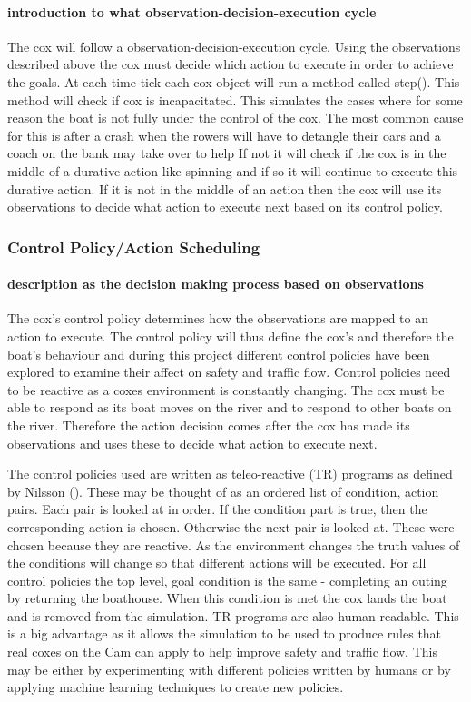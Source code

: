       \paragraph{introduction to what observation-decision-execution cycle}
      The cox will follow a observation-decision-execution cycle. Using the observations described above the cox must decide which action to execute in order to achieve the goals. At each time tick each cox object will run a method called step(). This method will check if cox is incapacitated. This simulates the cases where for some reason the boat is not fully under the control of the cox. The most common cause for this is after a crash when the rowers will have to detangle their oars and a coach on the bank may take over to help If not it will check if the cox is in the middle of a durative action like spinning and if so it will continue to execute this durative action. If it is not in the middle of an action then the cox will use its observations to decide what action to execute next based on its control policy.
      
      \subsubsection{Control Policy/Action Scheduling}
      \paragraph{description as the decision making process based on observations}
      The cox's control policy determines how the observations are mapped to an action to execute. The control policy will thus define the cox's and therefore the boat's behaviour and during this project different control policies have been explored to examine their affect on safety and traffic flow. Control policies need to be reactive as a coxes environment is constantly changing. The cox must be able to respond as its boat moves on the river and to respond to other boats on the river. Therefore the action decision comes after the cox has made its observations and uses these to decide what action to execute next.
      
      The control policies used are written as teleo-reactive (TR) programs as defined by Nilsson (\cite{Nilsson1994}). These may be thought of as an ordered list of condition, action pairs. Each pair is looked at in order. If the condition part is true, then the corresponding action is chosen. Otherwise the next pair is looked at. These were chosen because they are reactive. As the environment changes the truth values of the conditions will change so that different actions will be executed. For all control policies the top level, goal condition is the same - completing an outing by returning the boathouse. When this condition is met the cox lands the boat and is removed from the simulation. TR programs are also human readable. This is a big advantage as it allows the simulation to be used to produce rules that real coxes on the Cam can apply to help improve safety and traffic flow. This may be either by experimenting with different policies written by humans or by applying machine learning techniques to create new policies.
  
